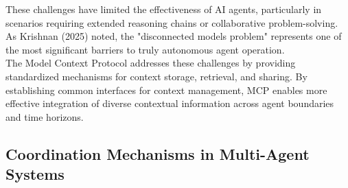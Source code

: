 These challenges have limited the effectiveness of AI agents, particularly in scenarios requiring extended reasoning chains or collaborative problem-solving. As Krishnan (2025) noted, the "disconnected models problem" represents one of the most significant barriers to truly autonomous agent operation.\\ \newline
The Model Context Protocol addresses these challenges by providing standardized mechanisms for context storage, retrieval, and sharing. By establishing common interfaces for context management, MCP enables more effective integration of diverse contextual information across agent boundaries and time horizons.\\
\subsection{Coordination Mechanisms in Multi-Agent Systems}
